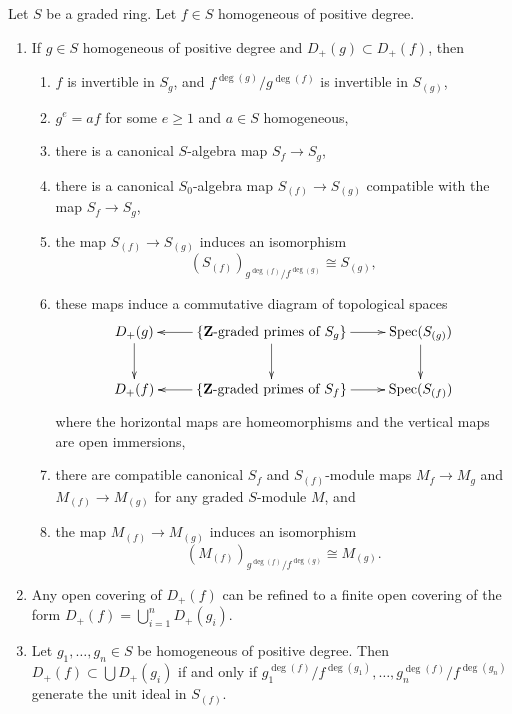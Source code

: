 \begin{lemma}
\label{lemma-standard-open}
Let $S$ be a graded ring. Let $f \in S$ homogeneous of positive degree.
\begin{enumerate}
\item If $g\in S$ homogeneous of positive degree
and $D_{+}(g) \subset D_{+}(f)$, then
\begin{enumerate}
\item $f$ is invertible in $S_g$, and
$f^{\deg(g)}/g^{\deg(f)}$ is invertible in $S_{(g)}$,
\item $g^e = af$ for some $e \geq 1$ and $a \in S$ homogeneous,
\item there is a canonical $S$-algebra map $S_f \to S_g$,
\item there is a canonical $S_0$-algebra map $S_{(f)} \to S_{(g)}$
compatible with the map $S_f \to S_g$,
\item the map $S_{(f)} \to S_{(g)}$ induces an isomorphism
$$
(S_{(f)})_{g^{\deg(f)}/f^{\deg(g)}} \cong S_{(g)},
$$
\item these maps induce a commutative diagram of
topological spaces
$$
\xymatrix{
D_{+}(g) \ar[d] &
\{\mathbf{Z}\text{-graded primes of }S_g\} \ar[l] \ar[r] \ar[d] &
\Spec(S_{(g)}) \ar[d] \\
D_{+}(f) &
\{\mathbf{Z}\text{-graded primes of }S_f\} \ar[l] \ar[r] &
\Spec(S_{(f)})
}
$$
where the horizontal maps are homeomorphisms and the vertical maps
are open immersions,
\item there are compatible canonical $S_f$ and $S_{(f)}$-module
maps $M_f \to M_g$ and $M_{(f)} \to M_{(g)}$ for any graded $S$-module $M$,
and
\item the map $M_{(f)} \to M_{(g)}$ induces an isomorphism
$$
(M_{(f)})_{g^{\deg(f)}/f^{\deg(g)}} \cong M_{(g)}.
$$
\end{enumerate}
\item Any open covering of $D_{+}(f)$ can be refined to a finite
open covering of the form $D_{+}(f) = \bigcup_{i = 1}^n D_{+}(g_i)$.
\item Let $g_1, \ldots, g_n \in S$ be homogeneous of positive degree.
Then $D_{+}(f) \subset \bigcup D_{+}(g_i)$
if and only if
$g_1^{\deg(f)}/f^{\deg(g_1)}, \ldots, g_n^{\deg(f)}/f^{\deg(g_n)}$
generate the unit ideal in $S_{(f)}$.
\end{enumerate}
\end{lemma}

